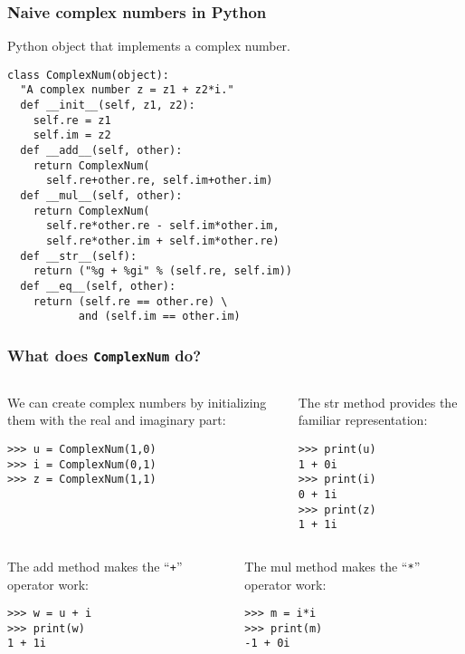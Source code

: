 \begin{frame}[fragile]\frametitle{Naive complex numbers in Python}
 Python object that implements a complex number.
\begin{lstlisting}[showstringspaces=false]
class ComplexNum(object):
  "A complex number z = z1 + z2*i."
  def __init__(self, z1, z2):
    self.re = z1
    self.im = z2
  def __add__(self, other):
    return ComplexNum(
      self.re+other.re, self.im+other.im)
  def __mul__(self, other):
    return ComplexNum(
      self.re*other.re - self.im*other.im,
      self.re*other.im + self.im*other.re)
  def __str__(self):
    return ("%g + %gi" % (self.re, self.im))
  def __eq__(self, other):
    return (self.re == other.re) \
           and (self.im == other.im)
\end{lstlisting}

\end{frame}

\begin{frame}[fragile]\frametitle{What does \texttt{ComplexNum} do?}
  \begin{columns}
    \begin{column}[t]{0.5\linewidth}
      We can create complex numbers by initializing them with the real
      and imaginary part:
\begin{lstlisting}
>>> u = ComplexNum(1,0)
>>> i = ComplexNum(0,1)
>>> z = ComplexNum(1,1)
\end{lstlisting}
    \end{column}
    \begin{column}[t]{0.5\linewidth}
      The str method provides the familiar
      representation:
\begin{lstlisting}
>>> print(u)
1 + 0i
>>> print(i)
0 + 1i
>>> print(z)
1 + 1i
\end{lstlisting}
    \end{column}
  \end{columns}

  \begin{columns}
    \begin{column}[t]{0.5\linewidth}
      The add method makes the ``\texttt{+}'' operator work:
\begin{lstlisting}
>>> w = u + i
>>> print(w)
1 + 1i
\end{lstlisting}
    \end{column}
    \begin{column}[t]{0.5\linewidth}
      The mul method makes the ``\texttt{*}'' operator work:
\begin{lstlisting}
>>> m = i*i
>>> print(m)
-1 + 0i
\end{lstlisting}
    \end{column}
  \end{columns}
\end{frame}

